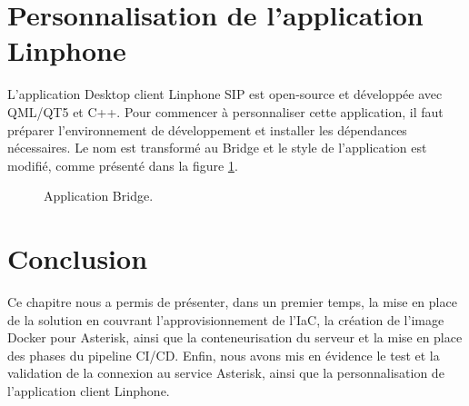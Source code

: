 \section{Personnalisation de l'application Linphone}
L'application Desktop client Linphone SIP est open-source et développée avec QML/QT5 et C++. Pour commencer à personnaliser cette application, il faut préparer l'environnement de développement et installer les dépendances nécessaires. Le nom est transformé au Bridge et le style de l'application est modifié, comme présenté dans la figure \ref{fig:linphone}.
\begin{figure}[H]
        \centering
        \caption{Application Bridge.}
        \label{fig:linphone}
\end{figure}

\section*{Conclusion}
Ce chapitre nous a permis de présenter, dans un premier temps, la mise en place de la solution en couvrant l'approvisionnement de l'IaC, la création de l'image Docker pour Asterisk, ainsi que la conteneurisation du serveur et la mise en place des phases du pipeline CI/CD. Enfin, nous avons mis en évidence le test et la validation de la connexion au service Asterisk, ainsi que la personnalisation de l'application client Linphone.







